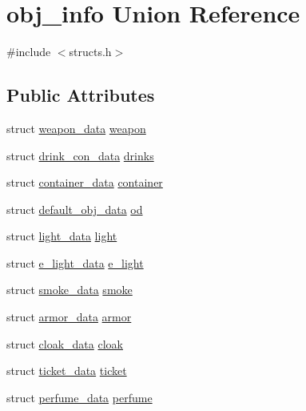 \hypertarget{unionobj__info}{\section{obj\-\_\-info Union Reference}
\label{unionobj__info}
}


{\ttfamily \#include $<$structs.\-h$>$}

\subsection*{Public Attributes}
\begin{DoxyCompactItemize}
\item 
struct \hyperlink{structweapon__data}{weapon\-\_\-data} \hyperlink{unionobj__info_a329dd76db6d64e6f464da0a50e4e2e64}{weapon}
\item 
struct \hyperlink{structdrink__con__data}{drink\-\_\-con\-\_\-data} \hyperlink{unionobj__info_ab9dc892b3698f9c8d58e580d9169bebb}{drinks}
\item 
struct \hyperlink{structcontainer__data}{container\-\_\-data} \hyperlink{unionobj__info_a9a6d0a0e2aeb4aa82fab9aeee341d0da}{container}
\item 
struct \hyperlink{structdefault__obj__data}{default\-\_\-obj\-\_\-data} \hyperlink{unionobj__info_a560bf8ec14547a42958e5e788d691660}{od}
\item 
struct \hyperlink{structlight__data}{light\-\_\-data} \hyperlink{unionobj__info_ad91b396eb5177b944eee479853d40160}{light}
\item 
struct \hyperlink{structe__light__data}{e\-\_\-light\-\_\-data} \hyperlink{unionobj__info_a1663a28a9ef4f0c9f82be5be72fa39a7}{e\-\_\-light}
\item 
struct \hyperlink{structsmoke__data}{smoke\-\_\-data} \hyperlink{unionobj__info_a97502f5e0508c9a90b5a98a572e8d315}{smoke}
\item 
struct \hyperlink{structarmor__data}{armor\-\_\-data} \hyperlink{unionobj__info_a552fc4f7734bc659341b5fd857a4aa11}{armor}
\item 
struct \hyperlink{structcloak__data}{cloak\-\_\-data} \hyperlink{unionobj__info_aa90c655fc6e7875a67dd4594ac93271b}{cloak}
\item 
struct \hyperlink{structticket__data}{ticket\-\_\-data} \hyperlink{unionobj__info_a1156da6fafea13f363480a74c0c763f8}{ticket}
\item 
struct \hyperlink{structperfume__data}{perfume\-\_\-data} \hyperlink{unionobj__info_a2bf9b1a07a23b823b21c7da48451ed5b}{perfume}

\end{DoxyCompactItemize}
